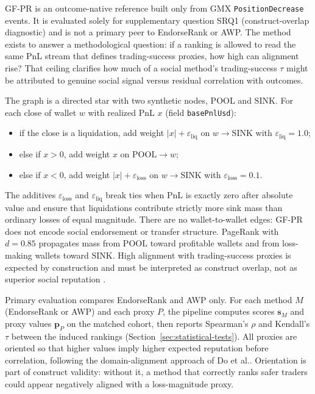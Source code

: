 
GF-PR is an outcome-native reference built only from GMX \texttt{PositionDecrease} events. It is evaluated solely for supplementary question SRQ1 (construct-overlap diagnostic) and is not a primary peer to EndorseRank or AWP. The method exists to answer a methodological question: if a ranking is allowed to read the same PnL stream that defines trading-success proxies, how high can alignment rise? That ceiling clarifies how much of a social method's trading-success $\tau$ might be attributed to genuine social signal versus residual correlation with outcomes.

The graph is a directed star with two synthetic nodes, $\mathrm{POOL}$ and $\mathrm{SINK}$. For each close of wallet $w$ with realized PnL $x$ (field \texttt{basePnlUsd}):
\begin{itemize}
\item if the close is a liquidation, add weight $|x|+\varepsilon_{\mathrm{liq}}$ on $w\to\mathrm{SINK}$ with $\varepsilon_{\mathrm{liq}}=1.0$;
\item else if $x>0$, add weight $x$ on $\mathrm{POOL}\to w$;
\item else if $x<0$, add weight $|x|+\varepsilon_{\mathrm{loss}}$ on $w\to\mathrm{SINK}$ with $\varepsilon_{\mathrm{loss}}=0.1$.
\end{itemize}
The additives $\varepsilon_{\mathrm{loss}}$ and $\varepsilon_{\mathrm{liq}}$ break ties when PnL is exactly zero after absolute value and ensure that liquidations contribute strictly more sink mass than ordinary losses of equal magnitude. There are no wallet-to-wallet edges: GF-PR does not encode social endorsement or transfer structure. PageRank with $d=0.85$ propagates mass from $\mathrm{POOL}$ toward profitable wallets and from loss-making wallets toward $\mathrm{SINK}$. High alignment with trading-success proxies is expected by construction and must be interpreted as construct overlap, not as superior social reputation .


Primary evaluation compares EndorseRank and AWP only. For each method $M$ (EndorseRank or AWP) and each proxy $P$, the pipeline computes scores $\mathbf{s}_M$ and proxy values $\mathbf{p}_P$ on the matched cohort, then reports Spearman's $\rho$ and Kendall's $\tau$ between the induced rankings (Section~\ref{sec:statistical-tests}). All proxies are oriented so that higher values imply higher expected reputation before correlation, following the domain-alignment approach of Do et al.. Orientation is part of construct validity: without it, a method that correctly ranks safer traders could appear negatively aligned with a loss-magnitude proxy.

